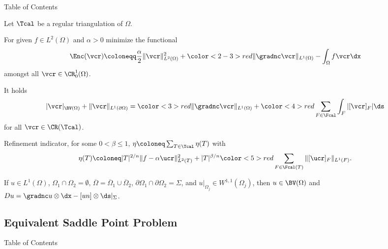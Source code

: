 \begin{frame}{Table of Contents}
\end{frame}

\begin{frame}
  Let $\Tcal$ be a regular triangulation of $\Omega$.

  For given $f\in L^2(\Omega)$ and $\alpha>0$ minimize the functional 
  \begin{align*}
    \Enc(\vcr)\coloneqq \frac{\alpha}{2}\Vert \vcr\Vert_{L^2(\Omega)}^2
    +{\color<2-3>{red}\Vert \gradnc\vcr\Vert_{L^1(\Omega)}}
    -\int_\Omega f\vcr\dx
  \end{align*}
  amongst all $\vcr\in \CR^1_0(\Omega)$.

  \pause
  \pause
  
  It holds 
  {
  \begin{align*}
    |\vcr|_{\BV(\Omega)}+\Vert \vcr\Vert_{L^1(\partial\Omega)}
    = {\color<3>{red}\Vert\gradnc\vcr\Vert_{L^1(\Omega)}}
    + {\color<4>{red}\sum_{F\in\Fcal}\int_F |[\vcr]_F|\ds}
  \end{align*}}
  for all $\vcr\in \CR(\Tcal)$.

  \pause
  \pause

   Refinement indicator, for some $0<\beta\leq 1$,
   $\eta\coloneq\sum_{T\in\Tcal}\eta(T)$ with
  \begin{align*}
    \eta(T)\coloneq |T|^{2/n}\Vert f-\alpha\ucr\Vert^2_{L^2(T)} 
    + |T|^{\beta/n}{\color<5>{red}\sum_{F\in\Fcal(T)}\Vert
    [\ucr]_F\Vert_{L^1(F)}}.
  \end{align*}

  \pause
  \pause

  If $u\in L^1(\Omega)$,
  $\Omega_1\cap\Omega_2=\emptyset$,
  $\overline{\Omega}=\overline{\Omega}_1\cup\overline{\Omega}_2$, 
  $\partial\Omega_1\cap\partial\Omega_2=\Sigma$, and $u|_{\Omega_j}\in
  W^{1,1}(\Omega_j)$, then $u\in\BV(\Omega)$ and {\color{red}$Du=\gradnc
  u\otimes\dx-[un]\otimes\ds|_\Sigma$}.
\end{frame}

\subsection{Equivalent Saddle Point Problem}
\begin{frame}{Table of Contents}
\end{frame}

